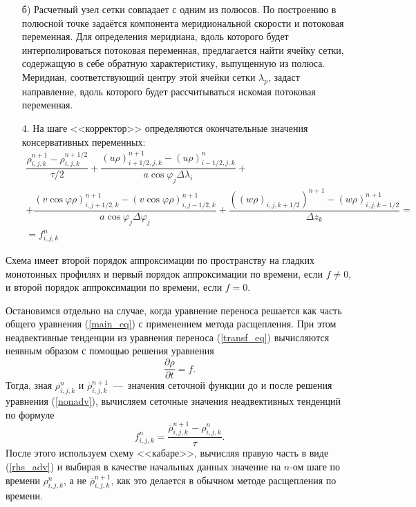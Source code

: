 \documentclass[14pt, a4paper]{extarticle}
\begin{document}
\begin{itemize}
б) Расчетный узел сетки совпадает с одним из полюсов. По построению в полюсной точке задаётся компонента меридиональной скорости и потоковая переменная. Для определения меридиана, вдоль которого будет интерполироваться потоковая переменная, предлагается найти ячейку сетки, содержащую в себе обратную характеристику, выпущенную из полюса. Меридиан, соответствующий центру этой ячейки сетки $\lambda_p$, задаст направление, вдоль которого будет рассчитываться искомая потоковая переменная.

\item[4.] На шаге <<корректор>> определяются окончательные значения консервативных переменных:
\begin{gather} 
\dfrac{\rho_{i,j,k}^{n+1}-\rho_{i,j,k}^{n+1/2}}{\tau/2}+\dfrac{(u\rho)_{i+1/2, j,k}^{n+1}-(u\rho)_{i-1/2, j,k}^n}{a\cos\varphi_j \Delta \lambda_i} +\nonumber\\+\dfrac{(v\cos\varphi \rho)_{i,j+1/2,k}^{n+1}-(v\cos\varphi \rho)_{i,j-1/2,k}^{n+1}}{a\cos\varphi_j \Delta\varphi_j}+ \dfrac{((w\rho)_{i,j,k+1/2})^{n+1}-(w\rho)_{i,j,k-1/2}^{n+1}}{\Delta z_k} =\nonumber \\=f_{i,j,k}^n \label{corrector}
\end{gather}


\end{itemize}

Схема имеет второй порядок аппроксимации по пространству на гладких монотонных профилях и первый порядок аппроксимации по времени, если  $f \neq 0$, и второй порядок аппроксимации по времени, если $f=0$.

\vspace{5mm}

Остановимся отдельно на случае, когда уравнение переноса решается как часть общего уравнения (\ref{main_eq}) с применением метода расщепления. При этом неадвективные тенденции из уравнения переноса (\ref{transf_eq}) вычисляются неявным образом с помощью решения уравнения  \begin{equation}\label{nonadv}
\dfrac{\partial \rho}{\partial t} = f.
\end{equation}
Тогда, зная $\rho_{i, j, k}^n$ и $\overline{\rho}_{i, j, k}^{n+1}$~---~значения сеточной функции до и после решения уравнения (\ref{nonadv}), вычисляем сеточные значения неадвективных тенденций по формуле \begin{equation}\label{rhs_adv} f_{i, j, k}^n = \dfrac{\overline{\rho}_{i, j, k}^{n+1}-\rho_{i, j, k}^n}{\tau}. \end{equation}
После этого используем схему <<кабаре>>, вычисляя правую часть в виде (\ref{rhs_adv}) и выбирая в качестве начальных данных значение на $n$-ом шаге по времени $\rho_{i, j, k}^n$, а не $\overline{\rho}_{i, j, k}^{n+1}$, как это делается в обычном методе расщепления по времени.
\end{document}
